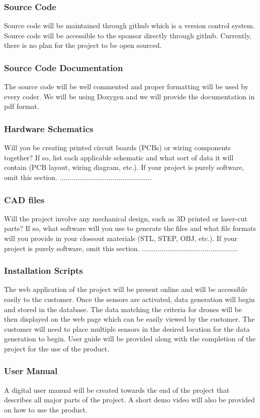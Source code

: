 \subsubsection{Source Code}
Source code will be maintained through github which is a version control system. Source code will be accessible to the sponsor directly through github. Currently, there is no plan for the project to be open sourced.

\subsubsection{Source Code Documentation}
The source code will be well commented and proper formatting will be used by every coder. We will be using Doxygen and we will provide the documentation in pdf format.

\subsubsection{Hardware Schematics}
Will you be creating printed circuit boards (PCBs) or wiring components together? If so, list each applicable schematic and what sort of data it will contain (PCB layout, wiring diagram, etc.). If your project is purely software, omit this section.
...............................................

\subsubsection{CAD files}
Will the project involve any mechanical design, such as 3D printed or laser-cut parts? If so, what software will you use to generate the files and what file formats will you provide in your closeout materials (STL, STEP, OBJ, etc.). If your project is purely software, omit this section.
.................................................

\subsubsection{Installation Scripts}
The web application of the project will be present online and will be accessible easily to the customer. Once the sensors are activated, data generation will begin and stored in the database. The data matching the criteria for drones will be then displayed on the web page which can be easily viewed by the customer. The customer will need to place multiple sensors in the desired location for the data generation to begin. User guide will be provided along with the completion of the project for the use of the product.  

\subsubsection{User Manual}
A digital user manual will be created towards the end of the project that describes all major parts of the project. A short demo video will also be provided on how to use the product.
